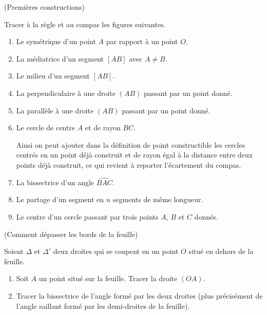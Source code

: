 \documentclass[a4paper,11pt,reqno]{amsart}
\begin{document}
\begin{exo} (Premières constructions)


  Tracer à la règle et au compas les figures suivantes.
  \begin{enumerate}
    \item Le symétrique d'un point $A$ par rapport à un point $O$.
    \item La médiatrice d'un segment $[AB]$ avec $A \neq B$.
    \item Le milieu d'un segment $[AB]$.
    \item La perpendiculaire à une droite $(AB)$ passant par un point donné.
    \item La parallèle à une droite $(AB)$ passant par un point donné.
    \item Le cercle de centre $A$ et de rayon $BC$.
    \begin{convention}
      Ainsi on peut ajouter dans la définition de point constructible les cercles centrés en un point déjà construit et de rayon égal à la distance entre deux points déjà construit, ce qui revient à reporter l'écartement du compas.
    \end{convention}
    \item La bissectrice d'un angle $\widehat{BAC}$.
    \item Le partage d'un segment en $n$ segments de même longueur.
    \item Le centre d'un cercle passant par trois points $A$, $B$ et $C$ donnés.
  \end{enumerate}
\end{exo}


\begin{exo}  (Comment dépasser les bords de la feuille)

  Soient $\Delta$ et $\Delta'$ deux droites qui se coupent en un point $O$ situé en dehors de la feuille.
  \begin{enumerate}
    \item Soit $A$ un point situé sur la feuille. Tracer la droite $(OA)$.
    \item Tracer la bissectrice de l'angle formé par les deux droites (plus précisément de l'angle saillant formé par les demi-droites de la feuille).
  \end{enumerate}

\end{exo}
\end{document}
